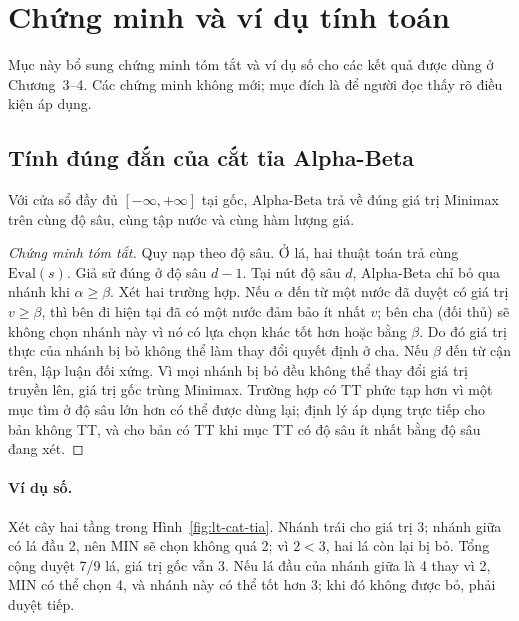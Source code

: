 \section{Chứng minh và ví dụ tính toán}
\label{sec:lt-chung-minh}
Mục này bổ sung chứng minh tóm tắt và ví dụ số cho các kết quả được dùng ở Chương~3--4. Các
chứng minh không mới; mục đích là để người đọc thấy rõ điều kiện áp dụng.

\subsection{Tính đúng đắn của cắt tỉa Alpha-Beta}
\begin{dinhly}
Với cửa sổ đầy đủ $[-\infty,+\infty]$ tại gốc, Alpha-Beta trả về đúng giá trị Minimax trên cùng
độ sâu, cùng tập nước và cùng hàm lượng giá.
\end{dinhly}
\begin{proof}[Chứng minh tóm tắt]
Quy nạp theo độ sâu. Ở lá, hai thuật toán trả cùng $\mathrm{Eval}(s)$. Giả sử đúng ở độ sâu
$d-1$. Tại nút độ sâu $d$, Alpha-Beta chỉ bỏ qua nhánh khi $\alpha \ge \beta$. Xét hai trường
hợp. Nếu $\alpha$ đến từ một nước đã duyệt có giá trị $v \ge \beta$, thì bên đi hiện tại đã có
một nước đảm bảo ít nhất $v$; bên cha (đối thủ) sẽ không chọn nhánh này vì nó có lựa chọn khác
tốt hơn hoặc bằng $\beta$. Do đó giá trị thực của nhánh bị bỏ không thể làm thay đổi quyết định
ở cha. Nếu $\beta$ đến từ cận trên, lập luận đối xứng. Vì mọi nhánh bị bỏ đều không thể thay
đổi giá trị truyền lên, giá trị gốc trùng Minimax. Trường hợp có TT phức tạp hơn vì một mục tìm
ở độ sâu lớn hơn có thể được dùng lại; định lý áp dụng trực tiếp cho bản không TT, và cho bản
có TT khi mục TT có độ sâu ít nhất bằng độ sâu đang xét.
\end{proof}

\paragraph{Ví dụ số.} Xét cây hai tầng trong Hình~\ref{fig:lt-cat-tia}. Nhánh trái cho giá trị 3;
nhánh giữa có lá đầu 2, nên MIN sẽ chọn không quá 2; vì $2 < 3$, hai lá còn lại bị bỏ. Tổng
cộng duyệt 7/9 lá, giá trị gốc vẫn 3. Nếu lá đầu của nhánh giữa là 4 thay vì 2, MIN có thể
chọn 4, và nhánh này có thể tốt hơn 3; khi đó không được bỏ, phải duyệt tiếp.

